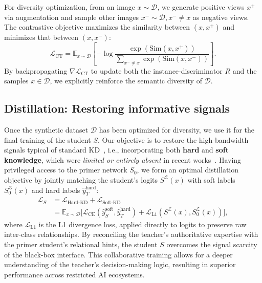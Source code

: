 \begin{foldable} %
    For diversity optimization, from an image $x\sim\mathcal{D}$, we generate positive views $x^{+}$ via augmentation and sample other images $x^{-}\sim\mathcal{D}, x^{-} \neq x$ as negative views.
    The contrastive objective maximizes the similarity between $(x, x^{+})$ and minimizes that between $(x, x^{-})$:
    \begin{equation} \label{ch4:eq:loss-contrastive}
        \mathcal{L}_{\text{CT}} = \mathbb{E}_{x \sim \mathcal{D}} \left[ -\log \frac{ \exp\left( \text{Sim}(x, x^{+}) \right) }{ \sum_{x^{-} \ne x} \exp\left( \text{Sim}(x, x^{-})  \right) } \right].
    \end{equation}
    By backpropagating $\nabla\mathcal{L}_{\text{CT}}$ to update both the instance-discriminator $R$ and the samples $x \in \mathcal{D}$, we explicitly reinforce the semantic diversity of $\mathcal{D}$.
\end{foldable}



\subsection{Distillation: Restoring informative signals} \label{ch4:ssec:03-framework-distillation}
\begin{foldable}
    Once the synthetic dataset $\mathcal{D}$ has been optimized for diversity, we use it for the final training of the student $S$.
    Our objective is to restore the high-bandwidth signals typical of standard KD~\cite{hinton2015distilling}, i.e., incorporating both \textbf{hard} and \textbf{soft knowledge}, which were \textit{limited or entirely absent} in recent works~\cite{wang2021zero, zhang2022ideal, yuan2024data}.
    Having privileged access to the primer network $S_0$, we form an optimal distillation objective by jointly matching the student's logits $S^{\mathcal{Z}}\left(x\right)$ with soft labels $S_{0}^{\mathcal{Z}}\left(x\right)$ and hard labels $\hat{y}_{T}^\text{hard}$:
    \begin{align} \label{ch4:eq:loss-kd-total}
        \mathcal{L}_{S}
        &= \mathcal{L}_{\text{Hard-KD}}+\mathcal{L}_{\text{Soft-KD}} \\
        &= \mathbb{E}_{x\sim\mathcal{D}}\Big[\mathcal{L}_{\text{CE}}\left(\hat{y}_{S}^\text{soft},\hat{y}_{T}^\text{hard}\right) + \mathcal{L}_{\text{L1}}\left(S^{\mathcal{Z}}\left(x\right),S_{0}^{\mathcal{Z}}\left(x\right)\right)\Big],
    \end{align}
    where $\mathcal{L}_{\text{L1}}$ is the L1 divergence loss, applied directly to logits to preserve raw inter-class relationships.
    By reconciling the teacher's authoritative expertise with the primer student's relational hints, the student $S$ overcomes the signal scarcity of the black-box interface.
    This collaborative training allows for a deeper understanding of the teacher's decision-making logic, resulting in superior performance across restricted AI ecosystems.
\end{foldable}
